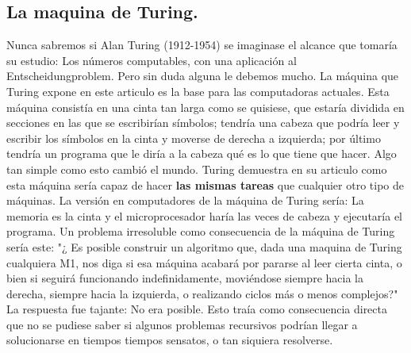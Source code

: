\documentclass[12pt]{article}
\begin{document}
\subsection {La maquina de Turing.}
Nunca sabremos si Alan Turing (1912-1954) se imaginase el alcance que tomaría su estudio: Los números computables, con una aplicación al Entscheidungproblem. Pero sin duda alguna le debemos mucho. La máquina que Turing expone en este articulo es la base para las computadoras actuales. Esta máquina consistía en una cinta tan larga como se quisiese, que estaría dividida en secciones en las que se escribirían símbolos; tendría una cabeza que podría leer y escribir los símbolos en la cinta y moverse de derecha a izquierda; por último tendría un programa que le diría a la cabeza qué es lo que tiene que hacer. Algo tan simple como esto cambió el mundo. Turing demuestra en su articulo como esta máquina sería capaz de hacer \textbf{las mismas tareas} que cualquier otro tipo de máquinas.
\newline
La versión en computadores de la máquina de Turing sería: La memoria es la cinta y el microprocesador haría las veces de cabeza y ejecutaría el programa.
\newline
Un problema irresoluble como consecuencia de la máquina de Turing sería este:
\newline
"¿ Es posible construir un algoritmo que, dada una maquina de Turing cualquiera M1, nos diga si esa máquina acabará por pararse al leer cierta cinta, o bien si seguirá funcionando indefinidamente, moviéndose siempre hacia la derecha, siempre hacia la izquierda, o realizando ciclos más o menos complejos?"\cite{Alfonseca}
\newline
La respuesta fue tajante: No era posible. Esto traía como consecuencia directa que no se pudiese saber si algunos problemas recursivos podrían llegar a solucionarse en tiempos tiempos sensatos, o tan siquiera resolverse.
\end{document}
